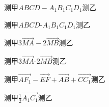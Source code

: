 \documentclass[fontset=none]{ctexart}
\begin{document}
\noindent 测甲\(ABCD-A_1B_1C_1D_1\)测乙

\noindent 测甲\(ABCD\text{-}A_1B_1C_1D_1\)测乙

\noindent 测甲\(3\overrightarrow{MA}-2\overrightarrow{MB}\)测乙

\noindent 测甲\(3\overrightarrow{MA}\text{-}2\overrightarrow{MB}\)测乙

\noindent 测甲\(\overrightarrow{AF_{1}}-\overrightarrow{EF}+\overrightarrow{AB}+\overrightarrow{CC_{1}}\)测乙

\noindent 测甲\(\frac{1}{2}\overrightarrow{A_1C_1}\)测乙
\end{document}
